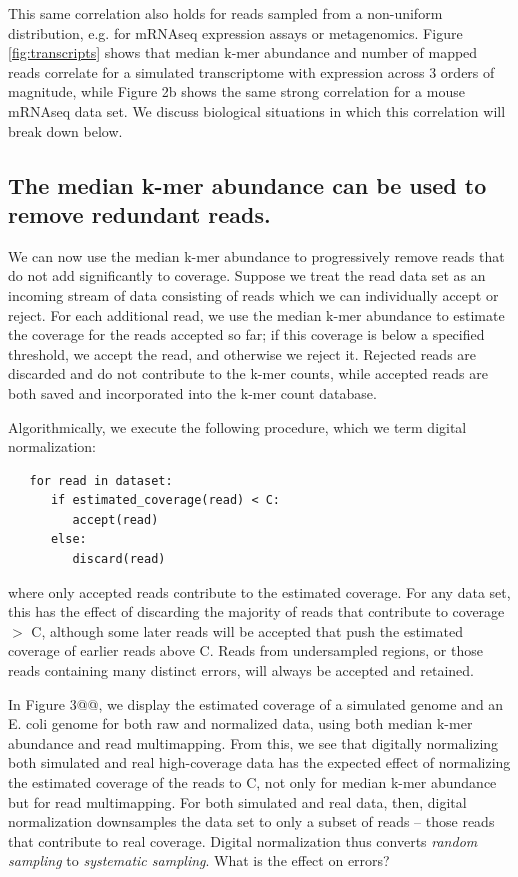 \documentclass[10pt,draft]{article}
\begin{document}
This same correlation also holds for reads sampled from a non-uniform
distribution, e.g. for mRNAseq expression assays or metagenomics.
Figure \ref{fig:transcripts} shows that median k-mer abundance and number of mapped reads
correlate for a simulated transcriptome with expression across 3
orders of magnitude, while Figure 2b shows the same strong correlation
for a mouse mRNAseq data set.  We discuss biological situations in which
this correlation will break down below.

\subsection*{The median k-mer abundance can be used to remove redundant reads.}

We can now use the median k-mer abundance to progressively remove
reads that do not add significantly to coverage.  Suppose we treat the
read data set as an incoming stream of data consisting of reads which
we can individually accept or reject.  For each additional read, we
use the median k-mer abundance to estimate the coverage for the reads
accepted so far; if this coverage is below a specified threshold, we
accept the read, and otherwise we reject it.  Rejected reads are
discarded and do not contribute to the k-mer counts, while accepted
reads are both saved and incorporated into the k-mer count database.

Algorithmically, we execute the following procedure, which we term
digital normalization:

\begin{verbatim}
   for read in dataset:
      if estimated_coverage(read) < C:
         accept(read)
      else:
         discard(read)
\end{verbatim}

where only accepted reads contribute to the estimated coverage.  For any
data set, this has the effect of discarding the majority of reads that
contribute to coverage $>$ C, although some later reads will be accepted
that push the estimated coverage of earlier reads above C.  Reads from
undersampled regions, or those reads containing many distinct errors, will always
be accepted and retained.

In Figure 3@@, we display the estimated coverage of a simulated genome
and an E. coli genome for both raw and normalized data, using both
median k-mer abundance and read multimapping.  From this, we see that
digitally normalizing both simulated and real high-coverage data has
the expected effect of normalizing the estimated coverage of the reads
to C, not only for median k-mer abundance but for read multimapping.
For both simulated and real data, then, digital normalization
downsamples the data set to only a subset of reads -- those reads that
contribute to real coverage.  Digital normalization thus converts {\em
random sampling} to {\em systematic sampling}.  What is the effect on
errors?
\end{document}
